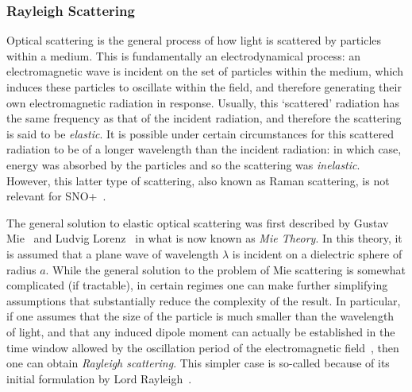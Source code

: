  \subsubsection{Rayleigh Scattering}
Optical scattering is the general process of how light is scattered by particles within a medium. This is fundamentally an electrodynamical process: an electromagnetic wave is incident on the set of particles within the medium, which induces these particles to oscillate within the field, and therefore generating their own electromagnetic radiation in response. Usually, this `scattered' radiation has the same frequency as that of the incident radiation, and therefore the scattering is said to be \textit{elastic}. It is possible under certain circumstances for this scattered radiation to be of a longer wavelength than the incident radiation: in which case, energy was absorbed by the particles and so the scattering was \textit{inelastic}. However, this latter type of scattering, also known as Raman scattering, is not relevant for SNO+~\cite{}. %

The general solution to elastic optical scattering was first described by Gustav Mie~\cite{} %
and Ludvig Lorenz~\cite{} %
in what is now known as \textit{Mie Theory}. In this theory, it is assumed that a plane wave of wavelength $\lambda$ is incident on a dielectric sphere of radius $a$. While the general solution to the problem of Mie scattering is somewhat complicated (if tractable), in certain regimes one can make further simplifying assumptions that substantially reduce the complexity of the result. In particular, if one assumes that the size of the particle is much smaller than the wavelength of light, and that any induced dipole moment can actually be established in the time window allowed by the oscillation period of the electromagnetic field~\cite{}, %
then one can obtain \textit{Rayleigh scattering}. This simpler case is so-called because of its initial formulation by Lord Rayleigh~\cite{}. %

